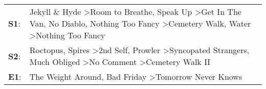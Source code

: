 \begin{supertabular}{p{0.03\textwidth}p{0.92\textwidth}}
 \textbf{S1}:  &  Jekyll \& Hyde\textsuperscript{} \textgreater \enspace Room to Breathe\textsuperscript{}, \enspace Speak Up\textsuperscript{} \textgreater \enspace Get In The Van\textsuperscript{}, \enspace No Diablo\textsuperscript{}, \enspace Nothing Too Fancy\textsuperscript{} \textgreater \enspace Cemetery Walk\textsuperscript{}, \enspace Water\textsuperscript{} \textgreater \enspace Nothing Too Fancy\textsuperscript{}  \enspace  \\
 \textbf{S2}:  &                                                        Roctopus\textsuperscript{}, \enspace Spires\textsuperscript{} \textgreater \enspace 2nd Self\textsuperscript{}, \enspace Prowler\textsuperscript{} \textgreater \enspace Syncopated Strangers\textsuperscript{}, \enspace Much Obliged\textsuperscript{} \textgreater \enspace No Comment\textsuperscript{} \textgreater \enspace Cemetery Walk II\textsuperscript{}  \enspace  \\
 \textbf{E1}:  &                                                                                                                                                                                                                                                                                     The Weight Around\textsuperscript{}, \enspace Bad Friday\textsuperscript{} \textgreater \enspace Tomorrow Never Knows\textsuperscript{}  \enspace  \\
\end{supertabular}
